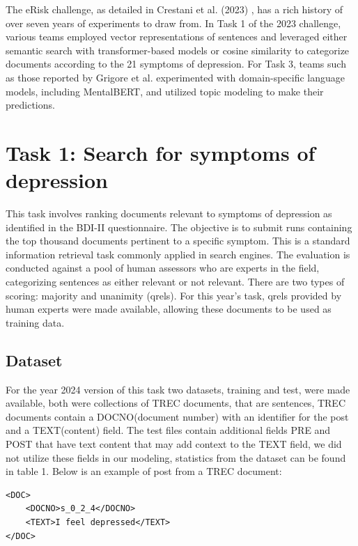 \documentclass[]{style/ceurart}
\begin{document}
The eRisk challenge, as detailed in Crestani et al. (2023) \cite{crestani_early_2022}, has a rich history of over seven years of experiments to draw from. 
In Task 1 of the 2023 challenge, various teams employed vector representations of sentences and leveraged either semantic search with transformer-based models or cosine similarity to categorize documents according to the 21 symptoms of depression\cite{recharla_notebook_nodate,wang_notebook_nodate}. For Task 3, teams such as those reported by Grigore et al. \cite{grigore_notebook_nodate} experimented with domain-specific language models, including MentalBERT, and utilized topic modeling to make their predictions.


\section{Task 1: Search for symptoms of depression}

This task involves ranking documents relevant to symptoms of depression as identified in the BDI-II questionnaire. The objective is to submit runs containing the top thousand documents pertinent to a specific symptom. This is a standard information retrieval task commonly applied in search engines. The evaluation is conducted against a pool of human assessors who are experts in the field, categorizing sentences as either relevant or not relevant. There are two types of scoring: majority and unanimity (qrels)\cite{noauthor_text_nodate}.
For this year's task, qrels provided by human experts were made available, allowing these documents to be used as training data.

\subsection{Dataset}

For the year 2024 version of this task two datasets, training and test, were made available, both were collections of TREC documents, that are sentences, TREC documents contain a DOCNO(document number) with an identifier for the post and a TEXT(content) field. The test files contain additional fields PRE and POST that have text content that may add context to the TEXT field, we did not utilize these fields in our modeling, statistics from the dataset can be found in table 1. Below is an example of post from a TREC document:

\begin{lstlisting}[label={lst:example}]
<DOC>
    <DOCNO>s_0_2_4</DOCNO>
    <TEXT>I feel depressed</TEXT>
</DOC>

\end{lstlisting}
\end{document}

